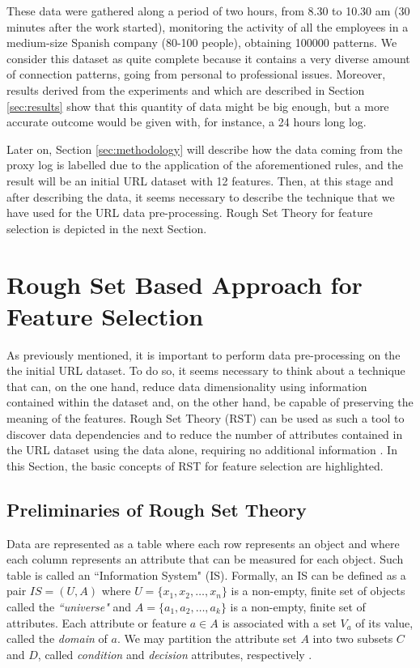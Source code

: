 \documentclass{llncs}
\begin{document}
These data were gathered along a period of two hours, from 8.30 to 10.30 am (30 minutes after the work started), monitoring the activity of all the employees in a medium-size Spanish company (80-100 people), obtaining 100000 patterns. We consider this dataset as quite complete because it contains a very diverse amount of connection patterns, going from personal to professional issues. Moreover, results derived from the experiments and which are described in Section \ref{sec:results} show that this quantity of data might be big enough, but a more accurate outcome would be given with, for instance, a 24 hours long log.

Later on, Section \ref{sec:methodology} will describe how the data coming from the proxy log is labelled due to the application of the aforementioned rules, and the result will be an initial URL dataset with 12 features. Then, at this stage and after describing the data, it seems necessary to describe the technique that we have used for the URL data pre-processing. Rough Set Theory for feature selection is depicted in the next Section.

%
\section{Rough Set Based Approach for Feature Selection}
\label{sec:featureselection}

As previously mentioned, it is important to perform data pre-processing on the the initial URL dataset.  To do so, it seems necessary to think about a technique that can, on the one hand, reduce data dimensionality using information contained within the dataset and, on the other hand, be capable of preserving the meaning of the features. Rough Set Theory (RST) \cite{pawlak2008rough} can be used as such a tool to discover data dependencies and to reduce the number of attributes contained in the URL dataset using the data alone, requiring no additional information \cite{jensen2005semantics}. In this Section, the basic concepts of RST for feature selection are highlighted.

\subsection{Preliminaries of Rough Set Theory}

Data are represented as a table where each row represents an object and where each column represents an attribute
that can be measured for each object. Such table is called an ``Information System" (IS). Formally, an IS can be defined as a pair $IS = (U, A)$ where $U = \{x_1, x_2, \ldots, x_n\}$  is a non-empty, finite set of objects called the \emph{``universe"} and $A = \{a_1, a_2, \ldots, a_k\}$ is a non-empty, finite set of attributes. Each attribute or feature $a \in A $ is associated with a set $V_a$ of its value, called the \emph{domain} of $a$. We may partition the attribute set $A$ into two subsets $C$ and $D$, called   \emph{condition} and \emph{decision} attributes, respectively \cite{pawlak2008rough}.
\end{document}
